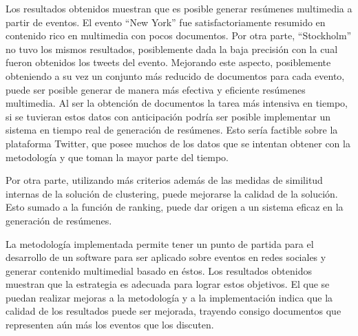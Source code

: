 Los resultados obtenidos muestran que es posible generar resúmenes multimedia
a partir de eventos. El evento ``New York'' fue satisfactoriamente resumido
en contenido rico en multimedia con pocos documentos. Por otra parte, ``Stockholm''
no tuvo los mismos resultados, posiblemente dada la baja precisión con la cual
fueron obtenidos los tweets del evento. Mejorando este aspecto, posiblemente
obteniendo a su vez un conjunto más reducido de documentos para cada evento, puede ser
posible generar de manera más efectiva y eficiente resúmenes multimedia. Al ser la obtención
de documentos la tarea más intensiva en tiempo, si se tuvieran estos datos con anticipación podría ser
posible implementar un sistema en tiempo real de generación de resúmenes. Esto sería factible
sobre la plataforma Twitter, que posee muchos de los datos que se intentan obtener con la metodología
y que toman la mayor parte del tiempo.

Por otra parte, utilizando más criterios además de las medidas de similitud internas de
la solución de clustering, puede mejorarse la calidad de la solución. Esto sumado a la función
de ranking, puede dar origen a un sistema eficaz en la generación de resúmenes.

La metodología implementada permite tener un punto de partida para el
desarrollo de un software para ser aplicado sobre eventos en redes
sociales y generar contenido multimedial basado en éstos. Los
resultados obtenidos muestran que la estrategia es adecuada para
lograr estos objetivos. El que se puedan realizar mejoras a la
metodología y a la implementación indica que la calidad de los
resultados puede ser mejorada, trayendo consigo documentos que
representen aún más los eventos que los discuten.